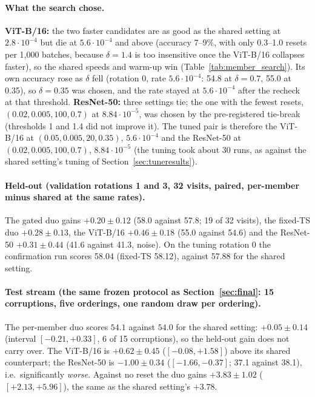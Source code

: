 \documentclass[10pt]{article}
\newcommand{\vit}{ViT-B/16}
\newcommand{\rn}{ResNet-50}
\begin{document}
\paragraph{What the search chose.} \textbf{\vit{}:} the two faster candidates are as good as the shared setting at $2.8 \cdot 10^{-4}$ but die at $5.6 \cdot 10^{-4}$ and above (accuracy 7--9\%, with only 0.3--1.0 resets per 1,000 batches, because $\delta = 1.4$ is too insensitive once the \vit{} collapses faster), so the shared speeds and warm-up win (Table~\ref{tab:member_search}). Its own accuracy rose as $\delta$ fell (rotation 0, rate $5.6 \cdot 10^{-4}$: 54.8 at $\delta = 0.7$, 55.0 at 0.35), so $\delta = 0.35$ was chosen, and the rate stayed at $5.6 \cdot 10^{-4}$ after the recheck at that threshold. \textbf{\rn{}:} three settings tie; the one with the fewest resets, $(0.02, 0.005, 100, 0.7)$ at $8.84 \cdot 10^{-5}$, was chosen by the pre-registered tie-break (thresholds 1 and 1.4 did not improve it). The tuned pair is therefore the \vit{} at $(0.05, 0.005, 20, 0.35)$, $5.6 \cdot 10^{-4}$ and the \rn{} at $(0.02, 0.005, 100, 0.7)$, $8.84 \cdot 10^{-5}$ (the tuning took about 30 runs, as against the shared setting's tuning of Section~\ref{sec:tuneresults}).

\paragraph{Held-out (validation rotations 1 and 3, 32 visits, paired, per-member minus shared at the same rates).} The gated duo gains $+0.20 \pm 0.12$ (58.0 against 57.8; 19 of 32 visits), the fixed-TS duo $+0.28 \pm 0.13$, the \vit{} $+0.46 \pm 0.18$ (55.0 against 54.6) and the \rn{} $+0.31 \pm 0.44$ (41.6 against 41.3, noise). On the tuning rotation 0 the confirmation run scores 58.04 (fixed-TS 58.12), against 57.88 for the shared setting.

\paragraph{Test stream (the same frozen protocol as Section~\ref{sec:final}: 15 corruptions, five orderings, one random draw per ordering).} The per-member duo scores $54.1$ against $54.0$ for the shared setting: $+0.05 \pm 0.14$ (interval $[-0.21, +0.33]$, 6 of 15 corruptions), so the held-out gain does not carry over. The \vit{} is $+0.62 \pm 0.45$ ($[-0.08, +1.58]$) above its shared counterpart; the \rn{} is $-1.00 \pm 0.34$ ($[-1.66, -0.37]$; 37.1 against 38.1), i.e.\ significantly \emph{worse}. Against no reset the duo gains $+3.83 \pm 1.02$ ($[+2.13, +5.96]$), the same as the shared setting's $+3.78$.
\end{document}
